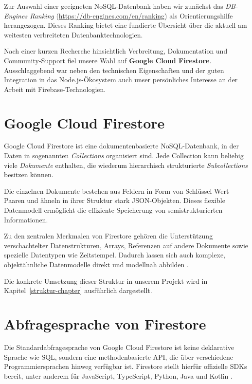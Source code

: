 \documentclass[12pt,a4paper%
              ,oneside     %
              ,titlepage
              ,DIV=13
              ,headinclude
              ,footinclude=false%
              ,cleardoublepage=empty%
              ,parskip=half,
              BCOR=0mm,
              ]{scrreprt}
\begin{document}
Zur Auswahl einer geeigneten NoSQL-Datenbank haben wir zunächst das \textit{DB-Engines Ranking} (\url{https://db-engines.com/en/ranking}) als Orientierungshilfe herangezogen. Dieses Ranking bietet eine fundierte Übersicht über die aktuell am weitesten verbreiteten Datenbanktechnologien.

Nach einer kurzen Recherche hinsichtlich Verbreitung, Dokumentation und Community-Support fiel unsere Wahl auf \textbf{Google Cloud Firestore}. Ausschlaggebend war neben den technischen Eigenschaften und der guten Integration in das Node.js-Ökosystem auch unser persönliches Interesse an der Arbeit mit Firebase-Technologien.

\section{Google Cloud Firestore}

Google Cloud Firestore ist eine dokumentenbasierte NoSQL-Datenbank, in der Daten in sogenannten \textit{Collections} organisiert sind. Jede Collection kann beliebig viele \textit{Dokumente} enthalten, die wiederum hierarchisch strukturierte \textit{Subcollections} besitzen können. 

Die einzelnen Dokumente bestehen aus Feldern in Form von Schlüssel-Wert-Paaren und ähneln in ihrer Struktur stark JSON-Objekten. Dieses flexible Datenmodell ermöglicht die effiziente Speicherung von semistrukturierten Informationen.

Zu den zentralen Merkmalen von Firestore gehören die Unterstützung verschachtelter Datenstrukturen, Arrays, Referenzen auf andere Dokumente sowie spezielle Datentypen wie Zeitstempel. Dadurch lassen sich auch komplexe, objektähnliche Datenmodelle direkt und modellnah abbilden \cite{Kesavan.2023, Firebase.2025, FirebaseDatenmodell.2025}.

Die konkrete Umsetzung dieser Struktur in unserem Projekt wird in Kapitel~\ref{struktur-chapter} ausführlich dargestellt.

\section{Abfragesprache von Firestore}
\label{sprache-firestore}

Die Standardabfragesprache von Google Cloud Firestore ist keine deklarative Sprache wie SQL, sondern eine methodenbasierte API, die über verschiedene Programmiersprachen hinweg verfügbar ist. Firestore stellt hierfür offizielle SDKs bereit, unter anderem für JavaScript, TypeScript, Python, Java und Kotlin \cite{GoogleCloudQueries.2025}.
\end{document}
